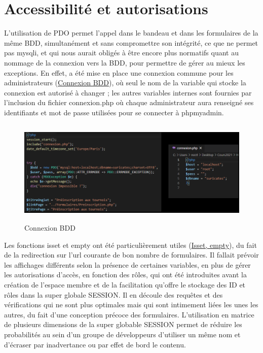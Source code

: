 \documentclass[12pt]{report}
\begin{document}
	    \section {Accessibilité et autorisations}
	    \hypertarget{annexe-access-et-auto}{}
\par
L’utilisation de PDO permet l’appel dans le bandeau et dans les formulaires de la même BDD, simultanément et sans compromettre son intégrité, ce que ne permet pas mysqli, et qui nous aurait obligés à être encore plus normatifs quant au nommage de la connexion vers la BDD, pour permettre de gérer au mieux les exceptions. En effet, a été mise en place une connexion commune pour les administrateurs (\hyperlink{fig-connexion}{Connexion BDD}), où seul le nom de la variable qui stocke la connexion est autorisé à changer ; les autres variables internes sont fournies par l’inclusion du fichier connexion.php où chaque administrateur aura renseigné ses identifiants et mot de passe utilisées pour se connecter à phpmyadmin.
 \begin{figure}[h]
 				\hypertarget{fig-connexion}{}
			\centering
				\includegraphics[height=5cm]{figures/pt-connexionbdd.png}
			\caption{Connexion BDD}
\end{figure}
\par
Les fonctions isset et empty ont été particulièrement utiles (\hyperlink{fig-issetempty}{Isset, empty}), du fait de la redirection sur l’url courante de bon nombre de formulaires. Il fallait prévoir les affichages différents selon la présence de certaines variables, en plus de gérer les autorisations d’accès, en fonction des rôles, qui ont été introduites avant la création de l’espace membre et de la facilitation qu’offre le stockage des ID et rôles dans la super globale SESSION. Il en découle des requêtes et des vérifications qui ne sont plus optimales mais qui sont intimement liées les unes les autres, du fait d’une conception précoce des formulaires. L’utilisation en matrice de plusieurs dimensions de la super globable SESSION permet de réduire les probabilités au sein d’un groupe de développeurs d’utiliser un même nom et d’écraser par inadvertance ou par effet de bord le contenu.
\end{document}
